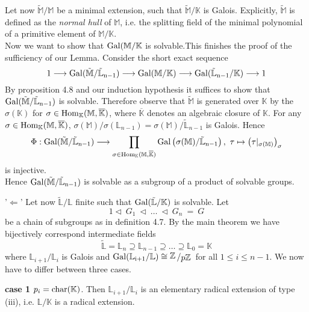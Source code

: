 \documentclass[12pt]{book}
\newcommand{\slant}[2]{{\raisebox{.1em}{$#1$}\left/\raisebox{-.1em}{$#2$}\right.}}
\begin{document}
\begin{spacing}{1.3}
\begin{compactitem}
\begin{compactitem}
Let now $\tilde{\mathbb{M}}/\mathbb{M}$ be a minimal extension, such that $\tilde{\mathbb{M}}/\mathbb{K}$ is Galois. Explicitly, $\tilde{\mathbb{M}}$ is defined as the \textit{normal hull} of $\mathbb{M}$, i.e. the splitting field of the minimal polynomial of a primitive element of $\mathbb{M}/\mathbb{K}$.\\
Now we want to show that $\rm{Gal}(\mathbb{M}/\mathbb{K}$ is solvable.This finishes the proof of the sufficiency of our Lemma. Consider the short exact sequence $$1 \longrightarrow \rm{Gal}(\tilde{\mathbb{M}}/\tilde{\mathbb{L}}_{n-1}) \longrightarrow \rm{Gal}(\mathbb{M}/\mathbb{K}) \longrightarrow \rm{Gal}(\tilde{\mathbb{L}}_{n-1}/\mathbb{K}) \longrightarrow 1$$ By proposition 4.8 and our induction hypothesis it suffices to show that $\rm{Gal}(\tilde{\mathbb{M}}/\tilde{\mathbb{L}}_{n-1})$ is solvable. Therefore observe that $\tilde{\mathbb{M}}$ is generated over $\mathbb{K}$ by the $\sigma(\mathbb{K})$ for $\sigma \in \rm{Hom}_{\mathbb{K}}(\mathbb{M}, \overline{\mathbb{K}})$, where $\overline{\mathbb{K}}$ denotes an algebraic closure of $\mathbb{K}$. For any $\sigma \in \rm{Hom}_{\mathbb{K}}(\mathbb{M},\overline{\mathbb{K}})$, $\sigma(\mathbb{M})/\sigma(\mathbb{L}_{n-1})=\sigma(\mathbb{M})/\tilde{\mathbb{L}}_{n-1}$ is Galois. Hence
$$\Phi: \rm{Gal}(\tilde{\mathbb{M}}/\tilde{\mathbb{L}}_{n-1}) \longrightarrow \prod_{\sigma \in \rm{Hom}_{\mathbb{K}}(\mathbb{M}, \overline{\mathbb{K}})} \rm{Gal}\left(\sigma(\mathbb{M})/\tilde{\mathbb{L}}_{n-1}\right), \textrm{ } \tau \mapsto \left(\tau |_{\sigma(\mathbb{M})}\right)_{\sigma}$$
is injective.
\\Hence $\rm{Gal}(\tilde{\mathbb{M}}/\tilde{\mathbb{L}}_{n-1})$ is solvable as a subgroup of a product of solvable groups.
\end{compactitem}
\item['$\Leftarrow$'] Let now $\tilde{\mathbb{L}}/\mathbb{L}$ finite such that $\rm{Gal}(\tilde{\mathbb{L}}/\mathbb{K})$ is solvable. Let 
$$1 \triangleleft \ G_1\ \triangleleft\ \dots \ \triangleleft\ G_n \ =\ G$$ be a chain of subgroups as in definition 4.7. By the main theorem we have bijectively correspond intermediate fields
$$ \tilde{\mathbb{L}}=\mathbb{L}_n \supseteq \mathbb{L}_{n-1} \supseteq \dots \supseteq \mathbb{L}_0 = \mathbb{K}$$
where $\mathbb{L}_{i+1}/\mathbb{L}_i$ is Galois and $\rm{Gal}(\mathbb{L}_{i+1}/\mathbb{L}) \cong \slant{\mathbb{Z}}{p \mathbb{Z}}$ for all $1 \leqslant i \leqslant n-1$. We now have to differ between three cases.
\begin{compactitem}
\item[\textbf{case 1}] $p_i=\rm{char}(\mathbb{K})$. Then $\mathbb{L}_{i+1}/\mathbb{L}_i$ is an elementary radical extension of type (iii), i.e. $\mathbb{L}/\mathbb{K}$ is a radical extension.

\end{compactitem}
\end{compactitem}
\end{spacing}
\end{document}
